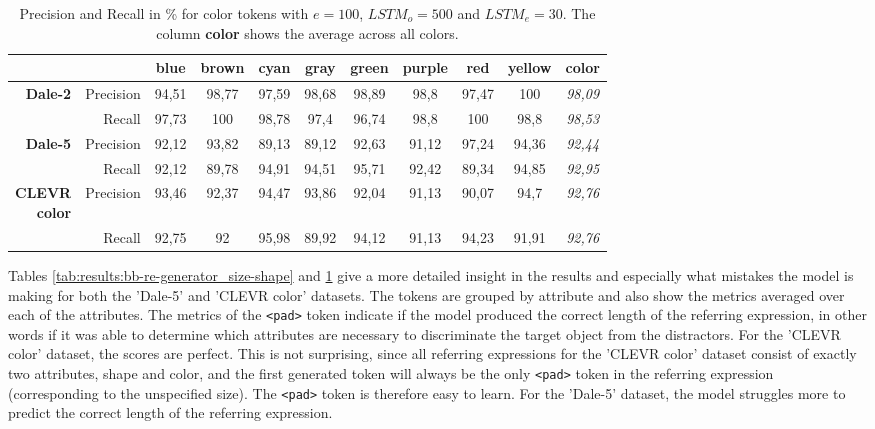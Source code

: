 \documentclass[11pt,a4paper]{article}
\begin{document}
\begin{table}[ht]
  \centering
  \begin{tabular}{rr|cccccccc|c}
    \toprule
                                     &             & {blue}  & {brown} & {cyan}  & {gray}  & {green} & {purple} & {red}   & {yellow} & \textbf{color} \\\midrule
    \multirow{2}{*}{\textbf{Dale-2}} & {Precision} & {94,51} & {98,77} & {97,59} & {98,68} & {98,89} & {98,8}   & {97,47} & {100}    & \emph{98,09} \\
                                     & {Recall}    & {97,73} & {100}   & {98,78} & {97,4}  & {96,74} & {98,8}   & {100}   & {98,8}   & \emph{98,53} \\\midrule
    \multirow{2}{*}{\textbf{Dale-5}} & {Precision} & {92,12} & {93,82} & {89,13} & {89,12} & {92,63} & {91,12}  & {97,24} & {94,36}  & \emph{92,44} \\
                                     & {Recall}    & {92,12} & {89,78} & {94,91} & {94,51} & {95,71} & {92,42}  & {89,34} & {94,85}  & \emph{92,95} \\\midrule
    \multirowcell{2}[0pt][r]{\textbf{CLEVR}                                                                                                           \\\textbf{color}} & {Precision}           & {93,46} & {92,37} & {94,47} & {93,86} & {92,04} & {91,13}  & {90,07} & {94,7}   & \emph{92,76} \\
                                     & {Recall}    & {92,75} & {92}    & {95,98} & {89,92} & {94,12} & {91,13}  & {94,23} & {91,91}  & \emph{92,76} \\
    \bottomrule
  \end{tabular}
  \caption{Precision and Recall in \% for color tokens with $e=100$, $LSTM_o=500$ and $LSTM_e=30$. The column \textbf{color} shows the average across all colors.}
  \label{tab:results:bb-re-generator_color}
\end{table}

Tables \ref{tab:results:bb-re-generator_size-shape} and \ref{tab:results:bb-re-generator_color} give a more detailed insight in the results and especially what mistakes the model is making for both the 'Dale-5' and 'CLEVR color' datasets.
The tokens are grouped by attribute and also show the metrics averaged over each of the attributes.
The metrics of the \texttt{<pad>} token indicate if the model produced the correct length of the referring expression, in other words if it was able to determine which attributes are necessary to discriminate the target object from the distractors.
For the 'CLEVR color' dataset, the scores are perfect.
This is not surprising, since all referring expressions for the 'CLEVR color' dataset consist of exactly two attributes, shape and color, and the first generated token will always be the only \texttt{<pad>} token in the referring expression (corresponding to the unspecified size).
The \texttt{<pad>} token is therefore easy to learn.
For the 'Dale-5' dataset, the model struggles more to predict the correct length of the referring expression.
\end{document}
